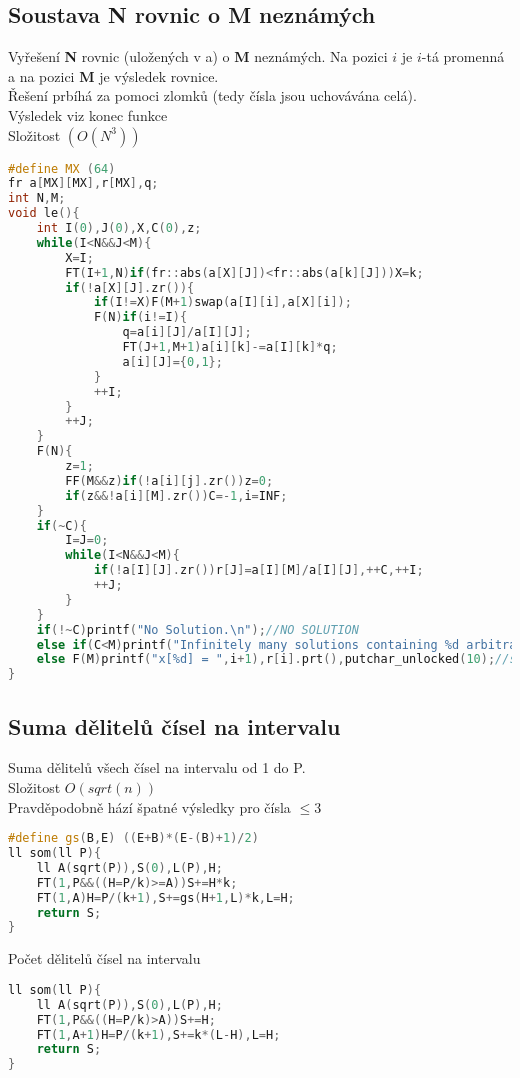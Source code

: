 \documentclass[11pt]{article}
\begin{document}
\subsection{Soustava N rovnic o M neznámých}
Vyřešení \textbf{N} rovnic (uložených v \textsf{a}) o \textbf{M} neznámých. Na pozici $i$ je $i$-tá promenná a na pozici \textbf{M} je výsledek rovnice.
\\Řešení prbíhá za pomoci zlomků (tedy čísla jsou uchovávána celá).
\\Výsledek viz konec funkce
\\Složitost $(O(N^3))$
\begin{lstlisting}[language=C++]
#define MX (64)
fr a[MX][MX],r[MX],q;
int N,M;
void le(){
    int I(0),J(0),X,C(0),z;
    while(I<N&&J<M){
        X=I;
        FT(I+1,N)if(fr::abs(a[X][J])<fr::abs(a[k][J]))X=k;
        if(!a[X][J].zr()){
            if(I!=X)F(M+1)swap(a[I][i],a[X][i]);
            F(N)if(i!=I){
                q=a[i][J]/a[I][J];
                FT(J+1,M+1)a[i][k]-=a[I][k]*q;
                a[i][J]={0,1};
            }
            ++I;
        }
        ++J;
    }
    F(N){
        z=1;
        FF(M&&z)if(!a[i][j].zr())z=0;
        if(z&&!a[i][M].zr())C=-1,i=INF;
    }
    if(~C){
        I=J=0;
        while(I<N&&J<M){
            if(!a[I][J].zr())r[J]=a[I][M]/a[I][J],++C,++I;
            ++J;
        }
    }
    if(!~C)printf("No Solution.\n");//NO SOLUTION
    else if(C<M)printf("Infinitely many solutions containing %d arbitrary constants.\n",M-C);//Any number of solutions (M-C are set)
    else F(M)printf("x[%d] = ",i+1),r[i].prt(),putchar_unlocked(10);//solution in "r"
}
\end{lstlisting}
\subsection{Suma dělitelů čísel na intervalu}
Suma dělitelů všech čísel na intervalu od 1 do \textsf{P}.
\\Složitost $O(sqrt(n))$
\\Pravděpodobně hází špatné výsledky pro čísla $\leq 3$
\begin{lstlisting}[language=C++]
#define gs(B,E) ((E+B)*(E-(B)+1)/2)
ll som(ll P){
    ll A(sqrt(P)),S(0),L(P),H;
    FT(1,P&&((H=P/k)>=A))S+=H*k;
    FT(1,A)H=P/(k+1),S+=gs(H+1,L)*k,L=H;
    return S;
}
\end{lstlisting}
Počet dělitelů čísel na intervalu
\begin{lstlisting}[language=C++]
ll som(ll P){
    ll A(sqrt(P)),S(0),L(P),H;
    FT(1,P&&((H=P/k)>A))S+=H;
    FT(1,A+1)H=P/(k+1),S+=k*(L-H),L=H;
    return S;
}
\end{lstlisting}
\end{document}

